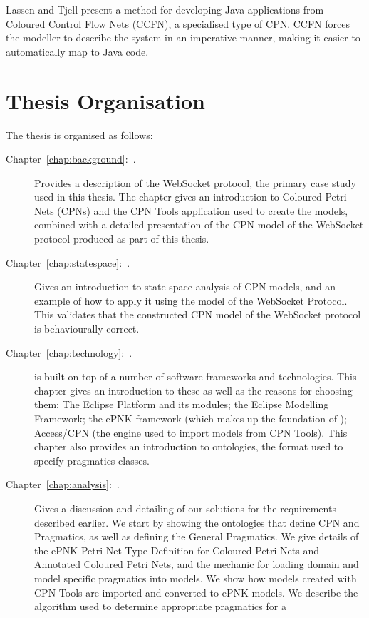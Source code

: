Lassen and Tjell \cite{lassen2010automatic}  present a method for developing
Java applications from Coloured Control Flow Nets (CCFN), a specialised type of
CPN. CCFN forces the modeller to describe the system in an
imperative manner, making it easier to automatically map to Java code.

\section{Thesis Organisation}
The thesis is organised as follows:

\begin{description}
\item[Chapter~\ref{chap:background}:~.] Provides a
description of the WebSocket protocol, the primary case study used in this
thesis. The chapter gives an introduction to Coloured Petri Nets (CPNs) and the
CPN Tools application used to create the models, combined with a detailed
presentation of the CPN model of the WebSocket protocol produced as part of this
thesis.
\item[Chapter~\ref{chap:statespace}:~.] Gives an
introduction to state space analysis of CPN models, and an example of how to
apply it using the model of the WebSocket Protocol. This validates that the
constructed CPN model of the WebSocket protocol is behaviourally correct.
\item [Chapter~\ref{chap:technology}:~.] \thename{} is built
on top of a number of software frameworks and technologies.
This chapter gives an introduction to these as well as the reasons for choosing
them: The Eclipse Platform and its modules; the Eclipse Modelling Framework; the ePNK
framework (which makes up the foundation of \thename{}); Access/CPN (the engine
used to import models from CPN Tools). This chapter also provides an
introduction to ontologies, the format used to specify pragmatics classes.
\item [Chapter~\ref{chap:analysis}:~.] Gives a
discussion and detailing of our solutions for the requirements described
earlier. We start by showing the ontologies that define CPN and Pragmatics, as
well as defining the General Pragmatics. We give details of the ePNK Petri Net
Type Definition for Coloured Petri Nets and Annotated Coloured Petri Nets, and
the mechanic for loading domain and model specific pragmatics into
models. We show how models created with CPN Tools are imported and converted to
ePNK models.
We describe the algorithm used to determine appropriate pragmatics for a

\end{description}
